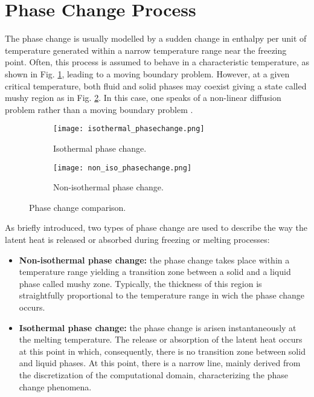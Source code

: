 \section{Phase Change Process}
\setlength{\parindent}{0.5cm} The phase change is usually modelled by a sudden change in enthalpy per unit of temperature generated within a narrow temperature range near the freezing point. Often, this process is assumed to behave in a characteristic temperature, as shown in Fig. \ref{1.5figa}, leading to a moving boundary problem. However, at a given critical temperature, both fluid and solid phases may coexist giving a state called mushy region as in Fig. \ref{1.5figb}. In this case, one speaks of a non-linear diffusion problem rather than a moving boundary problem \cite{krabbenhoft_damkilde_nazem_2006}. 
 
\begin{figure}[h!]
	\begin{subfigure}{0.50\textwidth}
		\centering
		\texttt{[image: isothermal\_phasechange.png]}\hfill
		\caption{Isothermal phase change.} 
		\label{1.5figa}
	\end{subfigure}
	\hfill
	\begin{subfigure}{0.50\textwidth}
		\centering
		\texttt{[image: non\_iso\_phasechange.png]}	
		\caption{Non-isothermal phase change.}
		\label{1.5figb}
	\end{subfigure}
\caption{Phase change comparison.}
\label{1.5fig}
\end{figure}

\noindent As briefly introduced, two types of phase change are used to describe the way the latent heat is released or absorbed during freezing or melting processes:
\begin{itemize}
	\item \textbf{Non-isothermal phase change:} the phase change takes place within a temperature range yielding a transition zone between a solid and a liquid phase called mushy zone. Typically, the thickness of this region is straightfully proportional to the temperature range in wich the phase change occurs.
	\item \textbf{Isothermal phase change:} the phase change is arisen instantaneously at the melting temperature. The release or absorption of the latent heat occurs at this point in which, consequently, there is no transition zone between solid and liquid phases. At this point, there is a narrow line, mainly derived from the discretization of the computational domain, characterizing the phase change phenomena.
\end{itemize}

